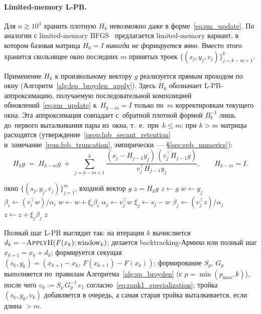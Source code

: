 \paragraph{Limited-memory L-PB.} Для $n\gtrsim 10^4$ хранить
плотную $H_k$ невозможно даже в форме~\eqref{eq:sm_update}. По аналогии
с limited-memory BFGS~\cite{lbfgs,liu1989} предлагается limited-memory
вариант, в котором базовая матрица $H_0=I$ \emph{никогда не
формируется явно}. Вместо этого хранится скользящее окно последних
$m$ принятых троек $\{(s_j, y_j, v_j)\}_{j=k-m+1}^{k}$.

Применение $H_k$ к произвольному вектору $g$ реализуется прямым
проходом по окну (Алгоритм~\ref{alg:lsp_broyden_apply}). Здесь $H_k$
обозначает L-PB-аппроксимацию, получаемую последовательной композицией
обновлений~\eqref{eq:sm_update} к~$H_{k-m}=I$ только по~$m$
корректировкам текущего окна. Эта аппроксимация совпадает с~обратной
плотной формой $B_k^{-1}$ лишь до~первого выталкивания пары из~окна,
т.~е.\ при~$k\le m$; при $k>m$ матрицы расходятся
(утверждение~\ref{prop:lpb_secant_retention}
и~замечание~\ref{rem:lpb_truncation}, эмпирически~--- \S\ref{sec:spb_numerics}):
\begin{equation}\label{eq:lsp_recursion}
  H_k g \;=\; H_{k-m} g \;+\; \sum_{j=k-m+1}^{k}
     \frac{(s_j - H_{j-1} y_j)\,(v_j^{\top} H_{j-1} g)}
          {v_j^{\top} H_{j-1} y_j},\qquad H_{k-m}=I.
\end{equation}

\begin{algorithm}[H]
\caption{Применение $H_k\,g$ для L-PB (прямой проход по окну)}
\label{alg:lsp_broyden_apply}
\begin{algorithmic}[1]
   \Require окно $\{(s_j, y_j, v_j)\}_{j=1}^{m}$, входной вектор $g$
   \Ensure $z = H_k g$
   \State $z \leftarrow g$ 
      \State $w \leftarrow y_j$ 
         \State $\beta_i \leftarrow (v_i^{\top} w)/\alpha_i$
         \State $w \leftarrow w + \xi_i \beta_i$
      \EndFor
      \State $\alpha_j \leftarrow v_j^{\top} w$
      \State $\xi_j \leftarrow s_j - w$
      \State $\beta_j \leftarrow (v_j^{\top} z)/\alpha_j$
      \State $z \leftarrow z + \xi_j \beta_j$
   \EndFor
   \State \Return $z$
\end{algorithmic}
\end{algorithm}

Полный шаг L-PB выглядит так: на итерации $k$ вычисляется
$d_k = -\Call{ApplyH}{F(x_k); \mathrm{window}_k}$; делается
backtracking-Армихо или полный шаг
$x_{k+1}=x_k+d_k$; формируется секущая
$(s_k, y_k) = (x_{k+1}-x_k,\, F(x_{k+1})-F(x_k))$;
формирование $S_p,\,G_p$ выполняется по~правилам
Алгоритма~\ref{alg:sp_broyden} (с $p = \min(p_{\max}, k)$), после чего
$v_k := S_p\,G_p^{-1}\,e_1$ согласно~\eqref{eq:rank1_specialization};
тройка $(s_k,y_k,v_k)$ добавляется в очередь, а самая старая тройка
выталкивается, если длина $> m$.

